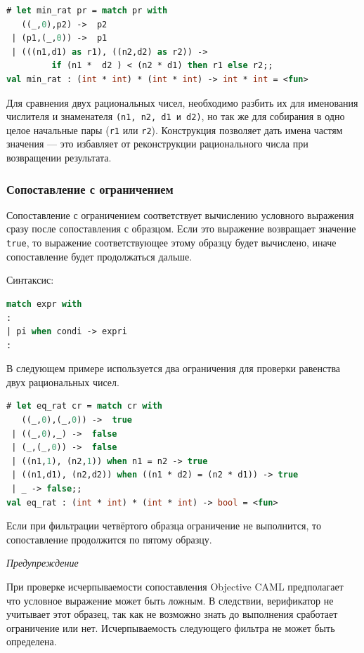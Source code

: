 \begin{lstlisting}[language=OCaml]
# let min_rat pr = match pr with
   ((_,0),p2) ->  p2
 | (p1,(_,0)) ->  p1
 | (((n1,d1) as r1), ((n2,d2) as r2)) ->
         if (n1 *  d2 ) < (n2 * d1) then r1 else r2;;
val min_rat : (int * int) * (int * int) -> int * int = <fun>
\end{lstlisting}

Для сравнения двух рациональных чисел, необходимо разбить их для именования
числителя и знаменателя \texttt{(n1, n2, d1 и d2)}, но так же для собирания в
одно целое начальные пары (\texttt{r1} или \texttt{r2}). Конструкция позволяет
дать имена частям значения --- это избавляет от реконструкции рационального
числа при возвращении результата.

\subsubsection{Сопоставление с ограничением}

Сопоставление с ограничением соответствует вычислению условного выражения сразу
после сопоставления с образцом. Если это выражение возвращает значение
\texttt{true}, то выражение соответствующее этому образцу будет вычислено, иначе
сопоставление будет продолжаться дальше.

Синтаксис:

\begin{lstlisting}[language=OCaml]
match expr with
:
| pi when condi -> expri
:
\end{lstlisting}

В следующем примере используется два ограничения для проверки равенства двух
рациональных чисел.

\begin{lstlisting}[language=OCaml]
# let eq_rat cr = match cr with
   ((_,0),(_,0)) ->  true
 | ((_,0),_) ->  false
 | (_,(_,0)) ->  false
 | ((n1,1), (n2,1)) when n1 = n2 -> true
 | ((n1,d1), (n2,d2)) when ((n1 * d2) = (n2 * d1)) -> true
 | _ -> false;;
val eq_rat : (int * int) * (int * int) -> bool = <fun>
\end{lstlisting}

Если при фильтрации четвёртого образца ограничение не выполнится, то
сопоставление продолжится по пятому образцу.

{\it Предупреждение}

При проверке исчерпываемости сопоставления Objective CAML предполагает что
условное выражение может быть ложным. В следствии, верификатор не учитывает этот
образец, так как не возможно знать до выполнения сработает ограничение или нет.
Исчерпываемость следующего фильтра не может быть определена.

